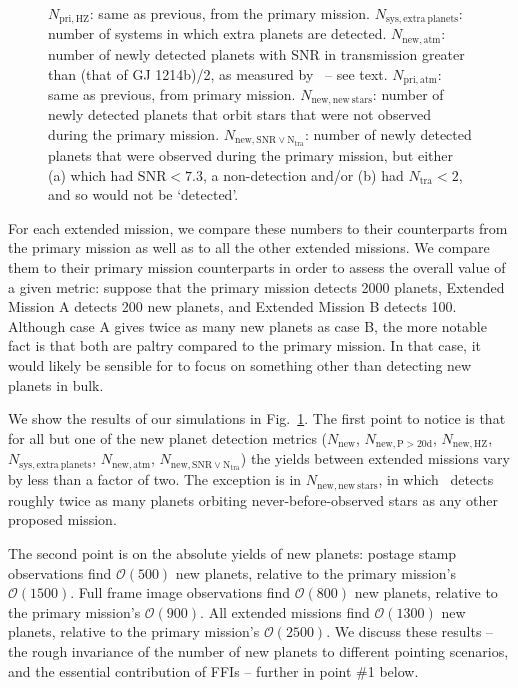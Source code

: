\begin{figure}[!t]
{	$N_\mathrm{pri,HZ}$: same as previous, from the primary mission.
	$N_\mathrm{sys,extra\ planets}$: number of systems in which extra planets are detected.
	$N_\mathrm{new,atm}$: number of newly detected planets with SNR in transmission greater than (that of GJ 1214b)/2, as measured by \jwst\ -- see text.
	$N_\mathrm{pri,atm}$: same as previous, from primary mission.
	$N_\mathrm{new,new\ stars}$: number of newly detected planets that orbit stars that were not observed during the primary mission.
	$N_\mathrm{new,SNR\lor N_{tra}}$: number of newly detected planets that were observed during the primary mission, but either (a) which had $\mathrm{SNR}<7.3$, a non-detection and/or (b) had $N_\mathrm{tra}<2$, and so would not be `detected'.}
	\label{fig:yield_results}
\end{figure}

For each extended mission, we compare these numbers to their counterparts from the primary mission as well as to all the other extended missions.
We compare them to their primary mission counterparts in order to assess the overall value of a given metric: suppose that the primary mission detects 2000 planets, Extended Mission A detects 200 new planets, and Extended Mission B detects 100. 
Although case A gives twice as many new planets as case B, the more notable fact is that both are paltry compared to the primary mission. 
In that case, it would likely be sensible for \tess to focus on something other than detecting new planets in bulk.

We show the results of our simulations in Fig.~\ref{fig:yield_results}.
The first point to notice is that for all but one of the new planet detection metrics ($N_\mathrm{new}$, $N_\mathrm{new,P>20d}$, $N_\mathrm{new,HZ}$, $N_\mathrm{sys,extra\ planets}$, $N_\mathrm{new,atm}$, $N_\mathrm{new,SNR\lor N_{tra}}$) the yields between extended missions vary by less than a factor of two.
The exception is in $N_\mathrm{new,new\ stars}$, in which \elong\ detects roughly twice as many planets orbiting never-before-observed stars as any other proposed mission.

The second point is on the absolute yields of new planets: postage stamp observations find $\mathcal{O}(500)$ new planets, relative to the primary mission's $\mathcal{O}(1500)$.
Full frame image observations find $\mathcal{O}(800)$ new planets, relative to the primary mission's $\mathcal{O}(900)$.
All extended missions find $\mathcal{O}(1300)$ new planets, relative to the primary mission's $\mathcal{O}(2500)$.
We discuss these results -- the rough invariance of the number of new planets to different pointing scenarios, and the essential contribution of FFIs -- further in point \#1 below.


